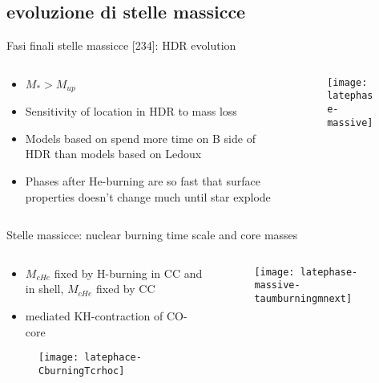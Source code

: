 \subsection{evoluzione di stelle massicce}

\begin{frame}{Fasi finali stelle massicce [234]: HDR evolution}
\begin{columns}[T]
	\begin{column}{0.65\textwidth}
		\begin{itemize}
		\item $M_*>M_{up}$
		\item Sensitivity of location in HDR to mass loss
		\item Models based on \sch spend more time on B side of HDR than models based on Ledoux
		\item Phases after He-burning are so fast that surface properties doesn't change much until star explode
		\end{itemize}
	\end{column}
	\begin{column}{0.35\textwidth}
		\begin{figure}[!ht]
			\texttt{[image: latephase-massive]}\label{fig:latephase-massive}
		\end{figure}
\end{column}\end{columns}
\end{frame}

\begin{frame}{Stelle massicce: nuclear burning time scale and core masses}
\begin{columns}[T]
	\begin{column}{0.5\textwidth}
		\begin{itemize}
		\item $M_{cHe}$ fixed by H-burning in CC and in shell, $M_{cHe}$ fixed by CC
		\item \Pnue mediated KH-contraction of CO-core
		\end{itemize}
	\begin{figure}[!ht]
	\texttt{[image: latephace-CburningTcrhoc]}\label{fig:latephace-CburningTcrhoc}
	\end{figure}
	\end{column}
	\begin{column}{0.4\textwidth}
		\begin{figure}[!ht]
			\texttt{[image: latephase-massive-taumburningmnext]}\label{fig:latephase-massive-taumburningmnext}
		\end{figure}
\end{column}\end{columns}
\end{frame}

